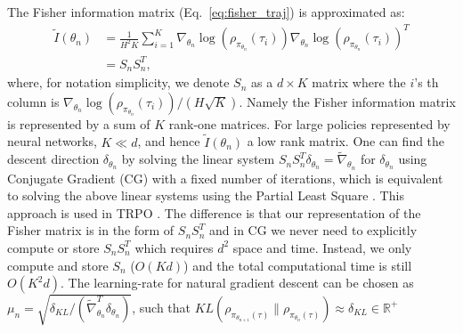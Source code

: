 \documentclass{article}
\newcommand{\wen}[1]{\textcolor{green}{\bf Wen: {#1}}}
\begin{document}
The Fisher information matrix (Eq.~\ref{eq:fisher_traj}) is approximated as:
\begin{align}
\tilde{I}(\theta_n) &= \frac{1}{H^2K}\sum_{i=1}^K \nabla_{\theta_n}\log(\rho_{\pi_{\theta_n}}(\tau_i))\nabla_{\theta_n}\log(\rho_{\pi_{\theta_n}}(\tau_i))^T \nonumber\\
& = S_n S_n^T,
\end{align} where, for notation simplicity, we denote $S_n$ as a $d\times K$ matrix where the $i$'s th column is $\nabla_{\theta_n}\log(\rho_{\pi_{\theta_n}}(\tau_i))/(H\sqrt{K})$. Namely the Fisher information matrix is represented by a sum of $K$ rank-one matrices. For large policies represented by neural networks, $K\ll d$, and hence  $\tilde{I}(\theta_n)$ a low rank matrix. %
One can find the descent direction $\delta_{\theta_n}$ by solving the linear system $S_nS_n^T \delta_{\theta_n} = \tilde{\nabla}_{\theta_n}$ for $\delta_{\theta_n}$ using Conjugate Gradient (CG) with a fixed number of iterations, which is equivalent to solving the above linear systems using the Partial Least Square \cite{phatak2002exploiting}. This approach is used in TRPO \cite{schulman2015trust}. The difference is that our representation of the Fisher matrix is in the form of $S_nS_n^T$ and in CG we never need to explicitly compute or store $S_nS_n^T$ which requires $d^2$ space and time. Instead, we only compute and store $S_n$ ($O(Kd)$) and the total computational time is still $O(K^2 d)$. The learning-rate for natural gradient descent can be chosen as $\mu_n = \sqrt{\delta_{KL}/(\tilde{\nabla}_{\theta_n}^T\delta_{\theta_n})}$, such that $KL(\rho_{\pi_{\theta_{n+1}}(\tau)}\|\rho_{\pi_{\theta_{n}}(\tau)})\approx \delta_{KL}\in\mathbb{R}^+$
\end{document}
